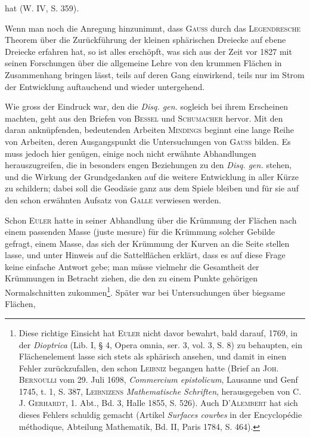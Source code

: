 hat (W. IV, S. 359).
\par
Wenn man noch die Anregung hinzunimmt, dass \textsc{Gauss} durch das \textsc{Legendresche}
Theorem über die Zurückführung der kleinen sphärischen Dreiecke
\clearpage{}\setcounter{footnote}{0}
\noindent auf ebene Dreiecke erfahren hat, so ist alles erschöpft, was sich aus der Zeit
vor 1827 mit seinen Forschungen über die allgemeine Lehre von den krummen
Flächen in Zusammenhang bringen lässt, teils auf deren Gang einwirkend,
teils nur im Strom der Entwicklung auftauchend und wieder untergehend.
\par
Wie gross der Eindruck war, den die \textit{Disq. gen.} sogleich bei ihrem Erscheinen
machten, geht aus den Briefen von \textsc{Bessel} und \textsc{Schumacher} hervor.
Mit den daran anknüpfenden, bedeutenden Arbeiten \textsc{Mindings} beginnt eine
lange Reihe von Arbeiten, deren Ausgangspunkt die Untersuchungen von \textsc{Gauss}
bilden. Es muss jedoch hier genügen, einige noch nicht erwähnte Abhandlungen
herauszugreifen, die in besonders engen Beziehungen zu den \textit{Disq. gen.}
stehen, und die Wirkung der Grundgedanken auf die weitere Entwicklung in
aller Kürze zu schildern; dabei soll die Geodäsie ganz aus dem Spiele bleiben
und für sie auf den schon erwähnten Aufsatz von \textsc{Galle} verwiesen werden.
\par
Schon \textsc{Euler} hatte in seiner Abhandlung über die Krümmung der Flächen
nach einem passenden Masse (juste mesure) für die Krümmung solcher Gebilde
gefragt, einem Masse, das sich der Krümmung der Kurven an die Seite stellen
lasse, und unter Hinweis auf die Sattelflächen erklärt, dass es auf diese Frage
keine einfache Antwort gebe; man müsse vielmehr die Gesamtheit der Krümmungen
in Betracht ziehen, die den zu einem Punkte gehörigen Normalschnitten
zukommen\footnote{Diese richtige Einsicht hat \textsc{Euler} nicht davor bewahrt, bald darauf, 1769, in der \textit{Dioptrica} (Lib. I, § 4, Opera omnia, ser. 3, vol. 3, S. 8) zu behaupten, ein Flächenelement lasse sich stets als sphärisch ansehen, und damit in einen Fehler zurückzufallen, den schon \textsc{Leibniz} begangen hatte (Brief an \textsc{Joh. Bernoulli} vom 29. Juli 1698, \textit{Commercium epistolicum}, Lausanne und Genf 1745, t. 1, S. 387, \textsc{Leibnizens} \textit{Mathematische Schriften}, herausgegeben von \textsc{C. J. Gerhardt}, 1. Abt., Bd. 3, Halle 1855, S. 526). Auch \textsc{D’Alembert} hat sich dieses Fehlers schuldig gemacht (Artikel \textit{Surfaces courbes} in der Encyclopédie méthodique, Abteilung Mathematik, Bd. II, Paris 1784, S. 464).}. Später war bei Untersuchungen über biegsame Flächen,
